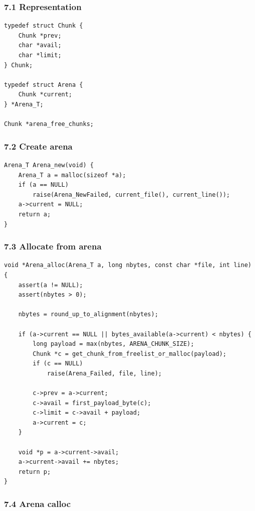 \documentclass[11pt]{article}
\begin{document}
\subsubsection{7.1 Representation}\label{representation}

\begin{verbatim}
typedef struct Chunk {
    Chunk *prev;
    char *avail;
    char *limit;
} Chunk;

typedef struct Arena {
    Chunk *current;
} *Arena_T;

Chunk *arena_free_chunks;
\end{verbatim}

\subsubsection{7.2 Create arena}\label{create-arena}

\begin{verbatim}
Arena_T Arena_new(void) {
    Arena_T a = malloc(sizeof *a);
    if (a == NULL)
        raise(Arena_NewFailed, current_file(), current_line());
    a->current = NULL;
    return a;
}
\end{verbatim}

\subsubsection{7.3 Allocate from arena}\label{allocate-from-arena}

\begin{verbatim}
void *Arena_alloc(Arena_T a, long nbytes, const char *file, int line) {
    assert(a != NULL);
    assert(nbytes > 0);

    nbytes = round_up_to_alignment(nbytes);

    if (a->current == NULL || bytes_available(a->current) < nbytes) {
        long payload = max(nbytes, ARENA_CHUNK_SIZE);
        Chunk *c = get_chunk_from_freelist_or_malloc(payload);
        if (c == NULL)
            raise(Arena_Failed, file, line);

        c->prev = a->current;
        c->avail = first_payload_byte(c);
        c->limit = c->avail + payload;
        a->current = c;
    }

    void *p = a->current->avail;
    a->current->avail += nbytes;
    return p;
}
\end{verbatim}

\subsubsection{7.4 Arena calloc}\label{arena-calloc}
\end{document}
